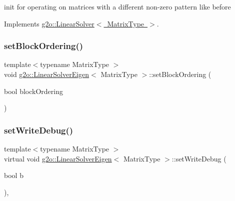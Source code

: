 init for operating on matrices with a different non-\/zero pattern like before 

Implements \mbox{\hyperlink{classg2o_1_1_linear_solver_aebd961a94ef6de1bc66d2ca41dd2b17b}{g2o\+::\+Linear\+Solver$<$ Matrix\+Type $>$}}.

\mbox{\label{classg2o_1_1_linear_solver_eigen_a33a924364fc517e69c5ade5aeacd8ee3}} 
\subsubsection{\texorpdfstring{set\+Block\+Ordering()}{setBlockOrdering()}}
{\footnotesize\ttfamily template$<$typename Matrix\+Type $>$ \\
void \mbox{\hyperlink{classg2o_1_1_linear_solver_eigen}{g2o\+::\+Linear\+Solver\+Eigen}}$<$ Matrix\+Type $>$\+::set\+Block\+Ordering (\begin{DoxyParamCaption}\item[{bool}]{block\+Ordering }\end{DoxyParamCaption})\hspace{0.3cm}{\ttfamily [inline]}}

\mbox{\label{classg2o_1_1_linear_solver_eigen_a5ceaab3ba944d327b21f7329c7e19c8c}} 
\subsubsection{\texorpdfstring{set\+Write\+Debug()}{setWriteDebug()}}
{\footnotesize\ttfamily template$<$typename Matrix\+Type $>$ \\
virtual void \mbox{\hyperlink{classg2o_1_1_linear_solver_eigen}{g2o\+::\+Linear\+Solver\+Eigen}}$<$ Matrix\+Type $>$\+::set\+Write\+Debug (\begin{DoxyParamCaption}\item[{bool}]{b }\end{DoxyParamCaption})\hspace{0.3cm}{\ttfamily [inline]}, {\ttfamily [virtual]}}



